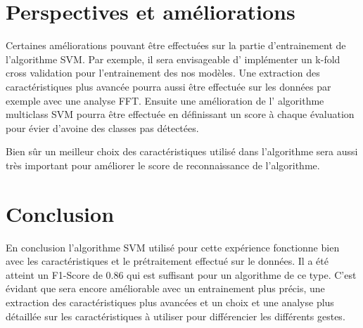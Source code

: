  

\section*{Perspectives et améliorations}
Certaines améliorations pouvant être effectuées sur la partie d'entrainement de l'algorithme SVM. Par exemple, il sera envisageable d’ implémenter un k-fold cross validation pour l'entrainement des nos modèles. 
Une extraction des caractéristiques plus avancée pourra aussi être effectuée sur les données par exemple avec une analyse FFT.
Ensuite une amélioration de l’ algorithme multiclass SVM pourra être effectuée en définissant un score à chaque évaluation pour évier d'avoine des classes pas détectées.

Bien sûr un meilleur choix des caractéristiques utilisé dans l'algorithme sera aussi très important pour améliorer le score de reconnaissance de l'algorithme.

\section*{Conclusion}
En conclusion l'algorithme SVM utilisé pour cette expérience fonctionne bien avec les caractéristiques et le prétraitement effectué sur le données. Il a été  atteint un F1-Score de 0.86 qui est suffisant pour un algorithme de ce type. C'est évidant que sera encore améliorable avec un entrainement plus précis, une extraction des caractéristiques plus avancées et un choix et une analyse plus détaillée sur les caractéristiques à utiliser pour différencier les différents gestes.










